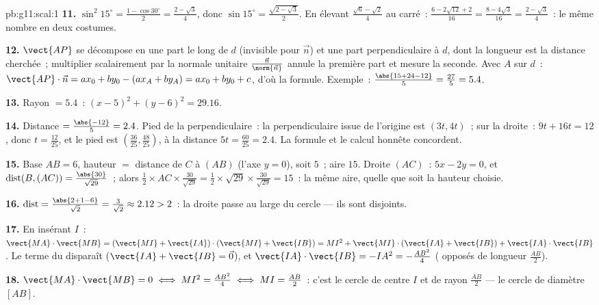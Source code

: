\begin{solution}{pb:g11:scal:1}
\textbf{11.} $\sin^2 15^\circ = \frac{1 - \cos 30^\circ}{2}
= \frac{2 - \sqrt3}{4}$, donc
$\sin 15^\circ = \frac{\sqrt{2 - \sqrt3}}{2}$. En élevant
$\frac{\sqrt6 - \sqrt2}{4}$ au carré~:
$\frac{6 - 2\sqrt{12} + 2}{16} = \frac{8 - 4\sqrt3}{16} =
\frac{2 - \sqrt3}{4}$~: le même nombre en deux costumes.

\textbf{12.} $\vect{AP}$ se décompose en une part le long de $d$
(invisible pour $\vec n$) et une part perpendiculaire à $d$, dont la
longueur est la distance cherchée~; multiplier scalairement par la
normale unitaire $\frac{\vec n}{\norm{\vec n}}$ annule la première
part et mesure la seconde. Avec $A$ sur $d$~:
$\vect{AP} \cdot \vec n = a x_0 + b y_0 - (a x_A + b y_A) =
a x_0 + b y_0 + c$, d'où la formule. Exemple~:
$\frac{\abs{15 + 24 - 12}}{5} = \frac{27}{5} = 5.4$.

\textbf{13.} Rayon $= 5.4$~: $(x - 5)^2 + (y - 6)^2 = 29.16$.

\textbf{14.} Distance $= \frac{\abs{-12}}{5} = 2.4$. Pied de la
perpendiculaire~: la perpendiculaire issue de l'origine est
$(3t, 4t)$~; sur la droite~: $9t + 16t = 12$, donc
$t = \frac{12}{25}$, et le pied est
$\left(\frac{36}{25}, \frac{48}{25}\right)$, à la distance
$5t = \frac{60}{25} = 2.4$. La formule et le calcul honnête
concordent.

\textbf{15.} Base $AB = 6$, hauteur $=$ distance de $C$ à $(AB)$
(l'axe $y = 0$), soit $5$~; aire $15$. Droite $(AC)$~:
$5x - 2y = 0$, et
$\operatorname{dist}(B, (AC)) = \frac{\abs{30}}{\sqrt{29}}$~;
alors $\frac12 \times AC \times \frac{30}{\sqrt{29}} =
\frac12 \times \sqrt{29} \times \frac{30}{\sqrt{29}} = 15$~: la
même aire, quelle que soit la hauteur choisie.

\textbf{16.} $\operatorname{dist} = \frac{\abs{2 + 1 - 6}}
{\sqrt2} = \frac{3}{\sqrt2} \approx 2.12 > 2$~: la droite passe au
large du cercle --- ils sont disjoints.

\textbf{17.} En insérant $I$~:
$\vect{MA} \cdot \vect{MB} = (\vect{MI} + \vect{IA}) \cdot
(\vect{MI} + \vect{IB}) = MI^2 + \vect{MI} \cdot (\vect{IA} +
\vect{IB}) + \vect{IA} \cdot \vect{IB}$. Le terme du 
disparaît ($\vect{IA} + \vect{IB} = \vec 0$), et
$\vect{IA} \cdot \vect{IB} = -IA^2 = -\frac{AB^2}{4}$ (
opposés de longueur $\frac{AB}2$).

\textbf{18.} $\vect{MA} \cdot \vect{MB} = 0 \iff MI^2 =
\frac{AB^2}{4} \iff MI = \frac{AB}{2}$~: c'est le cercle de centre
$I$ et de rayon $\frac{AB}2$ --- le cercle de diamètre $[AB]$.


\end{solution}
